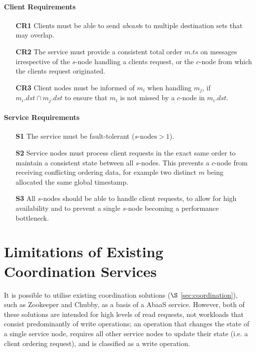 	\paragraph{Client Requirements} \hspace{0pt}
	\begin{itemize}
		\item [\textbf{CR1}] Clients must be able to send \emph{abcast}s to multiple destination sets that may overlap.
		
		\item [\textbf{CR2}] The service must provide a consistent total order $m.ts$ on messages irrespective of the $s$-node handling a clients request, or the $c$-node from which the clients request originated.  
		
		\item [\textbf{CR3}] Client nodes must be informed of $m_i$ when handling $m_j$, if $m_i.dst \cap m_j.dst$ to ensure that $m_i$ is not missed by a $c$-node in $m_i.dst$.  
	\end{itemize}
	
	\paragraph{Service Requirements} \hspace{0pt}
	\begin{itemize}
		\item [\textbf{S1}] The service must be fault-tolerant ($s\text{-nodes} > 1$).  
		
		\item [\textbf{S2}] Service nodes must process client requests in the exact same order to maintain a consistent state between all $s$-nodes.  This prevents a $c$-node from receiving conflicting ordering data, for example two distinct $m$ being allocated the same global timestamp.  
		
		\item [\textbf{S3}] All $s$-nodes should be able to handle client requests, to allow for high availability and to prevent a single $s$-node becoming a performance bottleneck.
	\end{itemize}

\section{Limitations of Existing Coordination Services}\label{sec:limitations_existing_coordination}
It is possible to utilise existing coordination solutions ($\S$ \ref{sec:coordination}), such as Zookeeper\citep{Hunt:2010:ZWC:1855840.1855851} and Chubby\citep{Burrows:2006:CLS:1298455.1298487}, as a basis of a \textsf{AbaaS} service.  However, both of these solutions are intended for high levels of read requests, not workloads that consist predominantly of write operations; an operation that changes the state of a single service node, requires all other service nodes to update their state (i.e. a client ordering request), and is classified as a write operation.  


